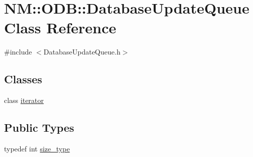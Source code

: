 \hypertarget{class_n_m_1_1_o_d_b_1_1_database_update_queue}{}\section{N\+M\+:\+:O\+D\+B\+:\+:Database\+Update\+Queue Class Reference}
\label{class_n_m_1_1_o_d_b_1_1_database_update_queue}


{\ttfamily \#include $<$Database\+Update\+Queue.\+h$>$}

\subsection*{Classes}
\begin{DoxyCompactItemize}
\item 
class \hyperlink{class_n_m_1_1_o_d_b_1_1_database_update_queue_1_1iterator}{iterator}
\end{DoxyCompactItemize}
\subsection*{Public Types}
\begin{DoxyCompactItemize}
\item 
typedef int \hyperlink{class_n_m_1_1_o_d_b_1_1_database_update_queue_a4a9f68d39b323a940c57db62b8f51506}{size\+\_\+type}
\end{DoxyCompactItemize}
